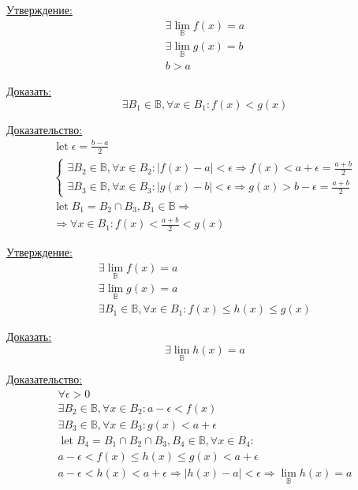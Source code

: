 \documentclass{article}
\DeclareMathOperator*{\Let}{let}
\begin{document}
\underline{Утверждение:}
\begin{gather*}
	\exists \lim_{\mathbb{B}} f(x) = a \\
	\exists \lim_{\mathbb{B}} g(x) = b \\
	b > a
\end{gather*}

\underline{Доказать:}
\[
\exists B_1 \in \mathbb{B}, \forall x \in B_1 : f(x) < g(x)
\]

\underline{Доказательство:}
\begin{gather*}
	\Let \epsilon = \frac{b - a}{2} \\
	\begin{cases}
		\exists B_2 \in \mathbb{B}, \forall x \in B_2 : |f(x) - a| < \epsilon \Rightarrow
		f(x) < a + \epsilon = \frac{a + b}{2} \\
		\exists B_3 \in \mathbb{B}, \forall x \in B_3 : |g(x) - b| < \epsilon \Rightarrow
		g(x) > b - \epsilon = \frac{a + b}{2}
	\end{cases} \\
	\Let B_1 = B_2 \cap B_3, B_1 \in \mathbb{B} \Rightarrow \\
	\Rightarrow \forall x \in B_1 : f(x) < \frac{a + b}{2} < g(x)
\end{gather*}


\underline{Утверждение:}
\begin{gather*}
	\exists \lim_{\mathbb{B}} f(x) = a \\
	\exists \lim_{\mathbb{B}} g(x) = a \\
	\exists B_1 \in \mathbb{B}, \forall x \in B_1 : f(x) \le h(x) \le g(x)
\end{gather*}

\underline{Доказать:}
\[
\exists \lim_{\mathbb{B}} h(x) = a
\]

\underline{Доказательство:}
\begin{gather*}
	\forall \epsilon > 0 \\
	\exists B_2 \in \mathbb{B}, \forall x \in B_2 : a - \epsilon < f(x) \\
	\exists B_3 \in \mathbb{B}, \forall x \in B_3 : g(x) < a + \epsilon \\
	\Let B_4 = B_1 \cap B_2 \cap B_3, B_4 \in \mathbb{B}, \forall x \in B_4 : \\
	a - \epsilon < f(x) \le h(x) \le g(x) < a + \epsilon \\
	a - \epsilon < h(x) < a + \epsilon \Rightarrow |h(x) - a| < \epsilon \Rightarrow
	\lim_{\mathbb{B}} h(x) = a
\end{gather*}
\end{document}
